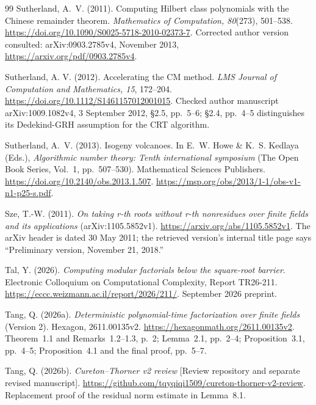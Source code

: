 \documentclass[11pt]{article}
\theoremstyle{definition}
\theoremstyle{remark}
\begin{document}
\begin{thebibliography}{99}
Sutherland, A.~V. (2011).
Computing Hilbert class polynomials with the Chinese remainder theorem.
\emph{Mathematics of Computation, 80}(273), 501--538.
\url{https://doi.org/10.1090/S0025-5718-2010-02373-7}.
Corrected author version consulted: arXiv:0903.2785v4, November 2013,
\url{https://arxiv.org/pdf/0903.2785v4}.

Sutherland, A. V. (2012).
Accelerating the CM method.
\emph{LMS Journal of Computation and Mathematics, 15}, 172--204.
\url{https://doi.org/10.1112/S1461157012001015}.
Checked author manuscript arXiv:1009.1082v4, 3 September 2012,
\S2.5, pp.~5--6; \S2.4, pp.~4--5 distinguishes its Dedekind-GRH
assumption for the CRT algorithm.

Sutherland, A.~V. (2013). Isogeny volcanoes.
In E.~W. Howe \& K.~S. Kedlaya (Eds.),
\emph{Algorithmic number theory: Tenth international symposium}
(The Open Book Series, Vol.~1, pp.~507--530). Mathematical Sciences Publishers.
\url{https://doi.org/10.2140/obs.2013.1.507}.
\url{https://msp.org/obs/2013/1-1/obs-v1-n1-p25-s.pdf}.

Sze, T.-W. (2011).
\emph{On taking r-th roots without r-th nonresidues over finite
fields and its applications} (arXiv:1105.5852v1).
\url{https://arxiv.org/abs/1105.5852v1}.
The arXiv header is dated 30 May 2011; the retrieved version's
internal title page says ``Preliminary version, November 21, 2018.''

Tal, Y. (2026).
\emph{Computing modular factorials below the square-root barrier}.
Electronic Colloquium on Computational Complexity, Report TR26-211.
\url{https://eccc.weizmann.ac.il/report/2026/211/}.
September 2026 preprint.

Tang, Q. (2026a).
\emph{Deterministic polynomial-time factorization over finite fields}
(Version 2). Hexagon, 2611.00135v2.
\url{https://hexagonmath.org/2611.00135v2}.
Theorem~1.1 and Remarks~1.2--1.3, p.~2; Lemma~2.1, pp.~2--4;
Proposition~3.1, pp.~4--5; Proposition~4.1 and the final proof,
pp.~5--7.

Tang, Q. (2026b).
\emph{Cureton--Thorner v2 review}
[Review repository and separate revised manuscript].
\url{https://github.com/tqyqiqi1509/cureton-thorner-v2-review}.
Replacement proof of the residual norm estimate in Lemma~8.1.


\end{thebibliography}
\end{document}

